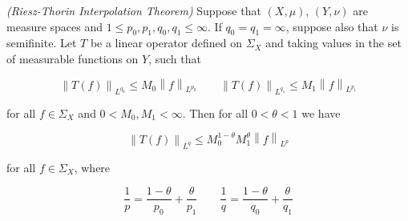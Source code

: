 \begin{mdframed}
	\begin{theorem}\emph{(Riesz-Thorin Interpolation Theorem)}
		Suppose that $(X,\mu)$, $(Y,\nu)$ are measure spaces and $1 \leqslant p_0,p_1,q_0,q_1 \leqslant \infty$. If $q_0 = q_1 = \infty$, suppose also that $\nu$ is semifinite. Let $T$ be a linear operator defined on $\Sigma_X$ and taking values in the set of measurable functions on $Y$, such that

		\begin{equation}
			\left\|T(f)\right\|_{L^{q_0}} \leqslant M_0\left\|f\right\|_{L^{p_0}} \qquad \left\|T(f)\right\|_{L^{q_1}} \leqslant M_1\left\|f\right\|_{L^{p_1}}
			\label{hyp:Lq0Lq1}
		\end{equation}

		for all $f \in \Sigma_X$ and $0 < M_0,M_1 < \infty$. Then for all $0 < \theta < 1$ we have

		\begin{equation}
			\left\|T(f)\right\|_{L^q} \leqslant M_0^{1 - \theta}M_1^\theta\left\|f\right\|_{L^p}
			\label{est:boundTf}
		\end{equation}

		for all $f \in \Sigma_X$, where

		\begin{equation*}
			\frac{1}{p} = \frac{1 - \theta}{p_0} + \frac{\theta}{p_1} \qquad \frac{1}{q} = \frac{1 - \theta}{q_0} + \frac{\theta}{q_1}
		\end{equation*}
		\label{thm:Riesz_Thorin}
	\end{theorem}
\end{mdframed}

